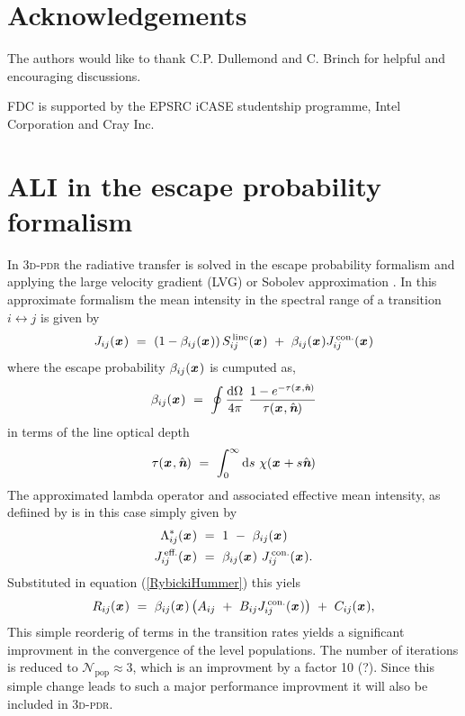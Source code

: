 \documentclass[a4paper,fleqn,usenatbib]{mnras}
\newcommand{\D}{\text{d}}
\newcommand{\x}{{\textit{\textbf{x}}}\,}
\newcommand{\n}{\hat{\textit{\textbf{n}}}}
\begin{document}
\section*{Acknowledgements}
The authors would like to thank C.P. Dullemond and C. Brinch for helpful and encouraging discussions.

FDC is supported by the EPSRC iCASE studentship programme, Intel Corporation and Cray Inc.










\appendix




\section{ALI in the escape probability formalism}
\label{Sobolev}

In \textsc{3d-pdr} the radiative transfer is solved in the escape probability formalism and applying the large velocity gradient (LVG) or Sobolev approximation \citep{Sobolev1960, Castor1970, deJong1975, Poelman2005}. In this approximate formalism the mean intensity in the spectral range of a transition $i \leftrightarrow j$ is given by
\begin{equation}
J_{ij}(\x) \ = \ \left(1-\beta_{ij}(\x)\right) S^{\,\text{line}}_{ij}(\x) \ + \ \beta_{ij}(\x) J^{\,\text{con.}}_{ij}(\x)
\end{equation}
where the escape probability $\beta_{ij}(\x)$ is cumputed as,
\begin{equation}
	\beta_{ij}(\x) \ = \ \oint \frac{\D \Omega}{4\pi} \ \frac{1-e^{-\tau(\x,\n)}}{\tau(\x,\n)}
\end{equation}
in terms of the line optical depth
\begin{equation}
	\tau(\x,\n) \ = \ \int_{0}^{\infty} \D s \ \chi(\x+s\n)
\end{equation}
The approximated lambda operator and associated effective mean intensity, as defiined by \citet{Rybicki1991} is in this case simply given by
\begin{equation}
\begin{split}
	\Lambda^{\ast}_{ij}(\x) \ &= \ 1 \ - \ \beta_{ij}(\x) \\
	J^{\,\text{eff.}}_{ij}(\x) \ &= \ \beta_{ij}(\x) \ J^{\,\text{con.}}_{ij}(\x).
\end{split}
\end{equation}
Substituted in equation (\ref{RybickiHummer}) this yiels
\begin{equation}
	R_{ij}(\x) \ = \  \beta_{ij}(\x) \left( A_{ij} \ + \ B_{ij} J^{\,\text{con.}}_{ij}(\x) \right) \ + \ C_{ij}(\x),
\end{equation}
This simple reorderig of terms in the transition rates yields a significant improvment in the convergence of the level populations. The number of iterations is reduced to $\mathcal{N}_{\text{pop}} \approx 3$, which is an improvment by a factor 10 (?). Since this simple change leads to such a major performance improvment it will also be included in \textsc{3d-pdr}.
\end{document}
